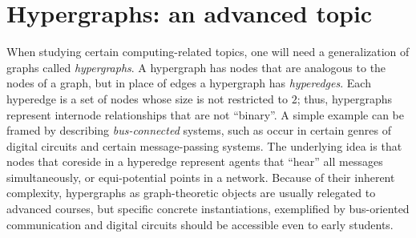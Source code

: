 \section{Hypergraphs: an advanced topic}

When studying certain computing-related topics, one will
need a generalization of graphs called {\em hypergraphs}.  A
hypergraph has nodes that are analogous to the nodes of a graph, but
in place of edges a hypergraph has {\em hyperedges}.  Each hyperedge
is a set of nodes whose size is not restricted to $2$; thus,
hypergraphs represent internode relationships that are not ``binary''.
A simple example can be framed by describing {\em bus-connected}
systems, such as occur in certain genres of digital circuits and
certain message-passing systems.  The underlying idea is that nodes
that coreside in a hyperedge represent agents that ``hear'' all
messages simultaneously, or equi-potential points in a network.
Because of their inherent complexity, hypergraphs as graph-theoretic
objects are usually relegated to advanced courses, but specific
concrete instantiations, exemplified by bus-oriented communication and
digital circuits should be accessible even to early students.


